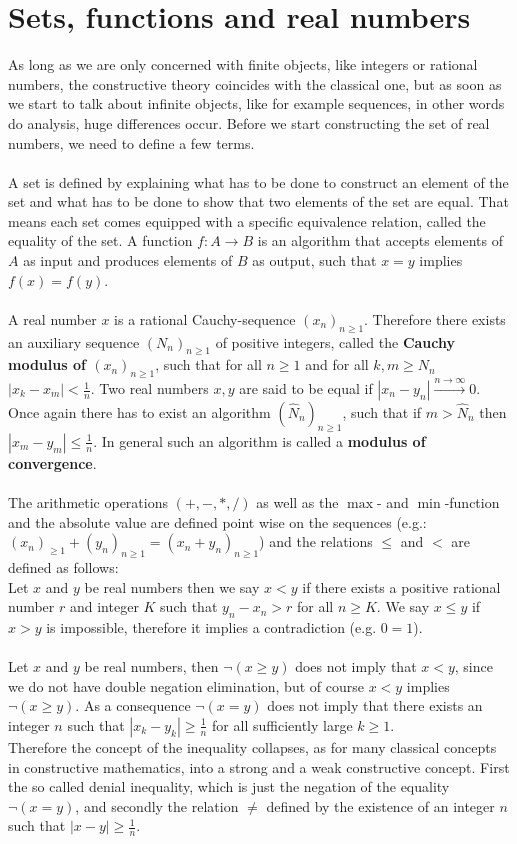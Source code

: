 \documentclass[11pt,a4paper,leqno]{report}
\numberwithin{equation}{chapter}
\begin{document}
\section{Sets, functions and real numbers}
As long as we are only concerned with finite objects, like integers or rational numbers, the constructive theory coincides with the classical one, but as soon as we start to talk about infinite objects, like for example sequences, in other words do analysis, huge differences occur. Before we start constructing the set of real numbers, we need to define a few terms. \\
\\
A set is defined by explaining what has to be done to construct an element of the set and what has to be done to show that two elements of the set are equal. That means each set comes equipped with a specific equivalence relation, called the equality of the set. A function $f:A\rightarrow B$ is an algorithm that accepts elements of $A$ as input and produces elements of $B$ as output, such that $x=y$ implies $f(x)=f(y)$.\\
\\
A real number $x$ is a rational Cauchy-sequence $(x_n)_{n\geq 1}$. Therefore there exists an auxiliary sequence $(N_n)_{n\geq 1}$ of positive integers, called the \textbf{Cauchy modulus of $(x_n)_{n\geq 1}$}, such that for all $n\geq 1$ and for all $k,m\geq N_n$ $|x_k-x_m|<\frac{1}{n}$. Two real numbers $x,y$ are said to be equal if $|x_n-y_n|\overset{n\rightarrow \infty}{\rightarrow} 0$. Once again there has to exist an algorithm $(\hat{N}_n)_{n\geq 1}$, such that if $m>\hat{N}_n$ then  $|x_m-y_m|\leq\frac{1}{n}$. In general such an algorithm is called a \textbf{modulus of convergence}.
\\
\\
The arithmetic operations \textbf{$(+,-,*,/)$ }as well as the \textbf{$\max$}- and \textbf{$\min$}-function and the absolute value are defined point wise on the sequences (e.g.: $(x_n)_{\geq 1}+(y_n)_{n\geq 1}=(x_n+y_n)_{n\geq 1}$) and the relations $\leq$ and $<$ are defined as follows: \\Let $x$ and $y$ be real numbers then we say $x<y$ if there exists a positive rational number $r$ and integer $K$ such that $y_n-x_n>r$ for all $n\geq K$. We say $x\leq y$ 
if $x>y$ is impossible, therefore it implies a contradiction (e.g. $0=1$).\\
\\
Let $x$ and $y$ be real numbers, then $\neg(x\geq y)$ does not imply that $x<y$, since we do not have double negation elimination, but of course $x<y$ implies $\neg(x\geq y)$. As a consequence $\neg(x=y)$ does not imply that there exists an integer $n$ such that $|x_k-y_k|\geq\frac{1}{n}$ for all sufficiently large $k\geq 1$. \\Therefore the concept of the inequality collapses, as for many classical concepts in constructive mathematics, into a strong and a weak constructive concept. First the so called denial inequality, which is just the negation of the equality $\neg (x=y)$, and secondly the relation $\neq$ defined by the existence of an integer $n$ such that $|x-y|\geq\frac{1}{n}$. 
\end{document}
